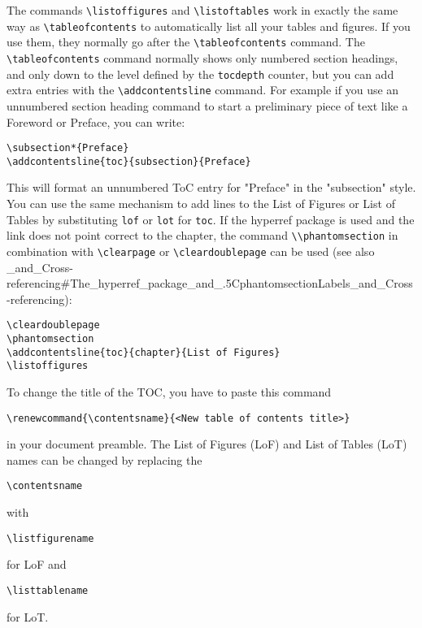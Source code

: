The commands \lstinline{\listoffigures} and \lstinline{\listoftables} work in
exactly the same way as \lstinline{\tableofcontents} to automatically list all
your tables and figures. If you use them, they normally go after the
\lstinline{\tableofcontents} command. The \lstinline{\tableofcontents} command
normally shows only numbered section headings, and only down to the level
defined by the \lstinline{tocdepth} counter, but you can add extra entries with
the \lstinline{\addcontentsline} command. For example if you use an unnumbered
section heading command to start a preliminary piece of text like a Foreword or
Preface, you can write:
\begin{lstlisting}
\subsection*{Preface}
\addcontentsline{toc}{subsection}{Preface}
\end{lstlisting}

This will format an unnumbered ToC entry for "Preface" in the "subsection"
style. You can use the same mechanism to add lines to the List of Figures or
List of Tables by substituting \texttt{lof} or \texttt{lot} for \texttt{toc}.
If the hyperref package is used and the link does not point correct to the
chapter, the command \lstinline{\\phantomsection} in combination with
\lstinline{\clearpage} or \lstinline{\cleardoublepage} can be used (see also
\_and\_Cross-referencing\#The\_hyperref\_package\_and\_.5CphantomsectionLabels\_and\_Cross-referencing):
\begin{lstlisting}
\cleardoublepage
\phantomsection
\addcontentsline{toc}{chapter}{List of Figures}
\listoffigures
\end{lstlisting}

To change the title of the TOC, you have to paste this command
\begin{lstlisting}
\renewcommand{\contentsname}{<New table of contents title>}
\end{lstlisting}

in your document preamble.  The List of Figures (LoF) and List of Tables (LoT)
names can be changed by replacing the 
\begin{lstlisting}
\contentsname
\end{lstlisting}
with 
\begin{lstlisting}
\listfigurename
\end{lstlisting}
for LoF and 
\begin{lstlisting}
\listtablename
\end{lstlisting}
for LoT.

